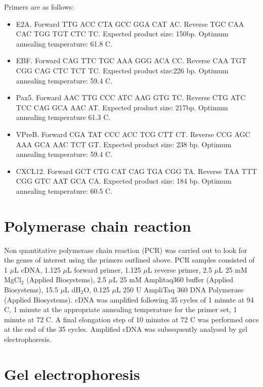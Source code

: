 Primers are as follows:
\begin{itemize}
\item E2A. Forward TTG ACC CTA GCC GGA CAT AC.
Reverse TGC CAA CAC TGG TGT CTC TC.
Expected product size: 150bp.
Optimum annealing temperature: 61.8 \textdegree C.

\item EBF.
Forward CAG TTC TGC AAA GGG ACA CC.
Reverse CAA TGT CGG CAG CTC TCT TC.
Expected product size:226 bp.
Optimum annealing temperature: 59.4 \textdegree C.

\item Pax5. Forward AAC TTG CCC ATC AAG GTG TC.
Reverse CTG ATC TCC CAG GCA AAC AT.
Expected product size: 217bp.
Optimum annealing temperature 61.3 \textdegree C.

\item VPreB.
Forward CGA TAT CCC ACC TCG CTT CT.
Reverse CCG AGC AAA GCA AAC TCT GT.
Expected product size: 238 bp.
Optimum annealing temperature: 59.4 \textdegree C.

\item CXCL12.
Forward GCT CTG CAT CAG TGA CGG TA.
Reverse TAA TTT CGG GTC AAT GCA CA.
Expected product size: 184 bp.
Optimum annealing temperature: 60.5 \textdegree C.
\end{itemize}

\section{Polymerase chain reaction}

Non quantitative polymerase chain reaction (PCR) was carried out to look for the genes of interest using the primers outlined above.
PCR samples consisted of 1 $\mu$L cDNA, 1.125 $\mu$L forward primer, 1.125 $\mu$L reverse primer, 2.5 $\mu$L 25 mM MgCl$_2$ (Applied Biosystems), 2.5 $\mu$L 25 mM Amplitaq360 buffer (Applied Biosystems), 15.5 $\mu$L dH$_2$O, 0.125 $\mu$L 250 U AmpliTaq 360 DNA Polymerase (Applied Biosystems).
cDNA was amplified following 35 cycles of 1 minute at 94 \textdegree C, 1 minute at the appropriate annealing temperature for the primer set, 1 minute at 72 \textdegree C. 
A final elongation step of 10 minutes at 72 \textdegree C was performed once at the end of the 35 cycles.
Amplified cDNA was subsequently analysed by gel electrophoresis.

\section{Gel electrophoresis}

